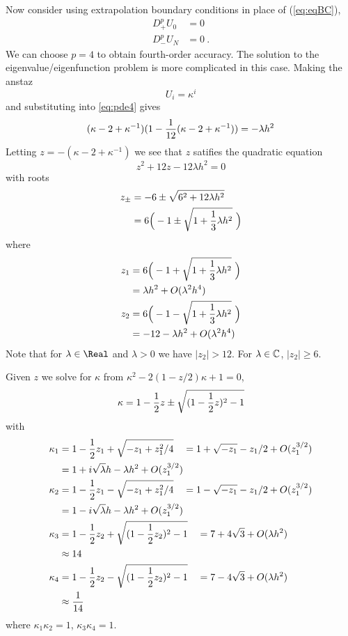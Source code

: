Now consider using extrapolation boundary conditions in place of (\ref{eq:eqBC}),
\begin{align}
    D_+^p U_0 &= 0     \label{eq:extrapBC}\\
    D_-^p U_N &= 0 ~.
\end{align}
We can choose $p=4$ to obtain fourth-order accuracy.
The solution to the eigenvalue/eigenfunction problem is more complicated in this case.
Making the anstaz
\[
    U_i = \kappa^i
\]
and substituting into \ref{eq:pde4} gives
\[
    (\kappa-2+\kappa^{-1})(1 - {1\over12}(\kappa-2+\kappa^{-1}) ) = -\lambda h^2
\]
Letting $z=-(\kappa-2+\kappa^{-1})$ we see that $z$ satifies the quadratic equation
\[
      z^2 + 12 z - 12 \lambda h^2 = 0
\]
with roots
\begin{align*}
      z_\pm &= -6 \pm \sqrt{ 6^2 + 12 \lambda h^2 } \\
            &= 6\Big( -1 \pm \sqrt{ 1 + {1\over3} \lambda h^2 } ~\Big)
\end{align*} 
where 
\begin{align*}
    z_1 &=6\Big( -1 + \sqrt{ 1 + {1\over3} \lambda h^2 } ~\Big) \\
        &=  \lambda h^2 + O( \lambda^2 h^4) \\
    z_2 &= 6\Big( -1 - \sqrt{ 1 + {1\over3} \lambda h^2 } ~\Big) \\
        & = -12 - \lambda h^2 + O( \lambda^2 h^4)
\end{align*}
Note that for $\lambda\in\Real$ and $\lambda>0$ we have $|z_2|>12$. For $\lambda\in{\Bbb C}$,
$|z_2|\ge 6$.

Given $z$ we solve for $\kappa$ from $\kappa^2-2(1-z/2)\kappa+1=0$,
\[
    \kappa = 1-{1\over2}z \pm \sqrt{ (1-{1\over2}z)^2 -1 }
\]
with
\begin{align*}
   \kappa_1 &= 1-{1\over2}z_1 + \sqrt{ - z_1 + z_1^2/4 }    
            \quad = 1 + \sqrt{-z_1} - z_1/2 +O(z_1^{3/2})  \\
            &= 1 + i\sqrt{\lambda} h - \lambda h^2 +O(z_1^{3/2})\\ 
   \kappa_2 &= 1-{1\over2}z_1 - \sqrt{ - z_1 + z_1^2/4 }    
            \quad = 1 - \sqrt{-z_1} - z_1/2 +O(z_1^{3/2})  \\
            &= 1 - i\sqrt{\lambda} h - \lambda h^2 +O(z_1^{3/2})\\ 
   \kappa_3 &= 1-{1\over2}z_2 + \sqrt{ (1-{1\over2}z_2)^2 -1 }   
            \quad = 7 + 4\sqrt{3} + O(\lambda h^2) \\
            &\approx 14   \\        
   \kappa_4 &= 1-{1\over2}z_2 - \sqrt{ (1-{1\over2}z_2)^2 -1 }    
            \quad = 7 - 4\sqrt{3} + O(\lambda h^2) \\
            &\approx {1\over 14} 
\end{align*}
where $\kappa_1\kappa_2=1$, $\kappa_3\kappa_4=1$.

